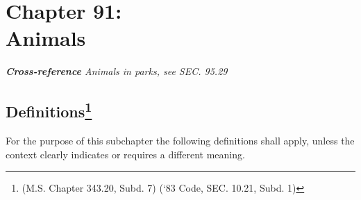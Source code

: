 \chapter*{Chapter 91: \\
	Animals}
    \minitoc
    \emph{\textbf{Cross-reference} Animals in parks, see SEC. 95.29}
    \pagebreak



\section{Definitions\footnote{(M.S. Chapter 343.20, Subd. 7)  (‘83 Code, SEC. 10.21, Subd. 1)}}
For the purpose of this subchapter the following definitions shall apply, unless the context clearly indicates or requires a different meaning.
